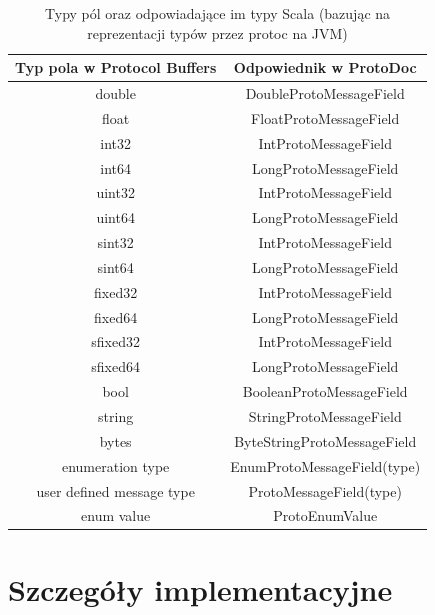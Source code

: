 \documentclass[pdflatex,11pt]{aghdpl}
\begin{document}
\begin{table}
 \begin{center}
\begin{tabular}[c]{|c|c|}
\hline 
Typ pola w Protocol Buffers & Odpowiednik w ProtoDoc\\ \hline

double   & DoubleProtoMessageField \\ \hline
float    & FloatProtoMessageField \\ \hline
int32    & IntProtoMessageField \\ \hline
int64    & LongProtoMessageField \\ \hline 
uint32   & IntProtoMessageField \\ \hline 
uint64   & LongProtoMessageField \\ \hline 
sint32   & IntProtoMessageField \\ \hline 
sint64   & LongProtoMessageField \\ \hline 
fixed32  & IntProtoMessageField \\ \hline 
fixed64  & LongProtoMessageField \\ \hline 
sfixed32 & IntProtoMessageField \\ \hline 
sfixed64 & LongProtoMessageField \\ \hline 
bool     & BooleanProtoMessageField \\ \hline
string   & StringProtoMessageField \\ \hline 
bytes    & ByteStringProtoMessageField \\ \hline \hline 
enumeration type & EnumProtoMessageField(type) \\ \hline
user defined message type & ProtoMessageField(type) \\ \hline \hline 
enum value & ProtoEnumValue \\ \hline
 \end{tabular}
 \end{center}
\label{tab:field_types}
\caption{Typy pól oraz odpowiadające im typy Scala \small{(bazując na reprezentacji typów przez protoc na JVM)}}
\end{table}


\chapter{Szczegóły implementacyjne}
\label{sec:zastosowanePodejscie}
\end{document}
